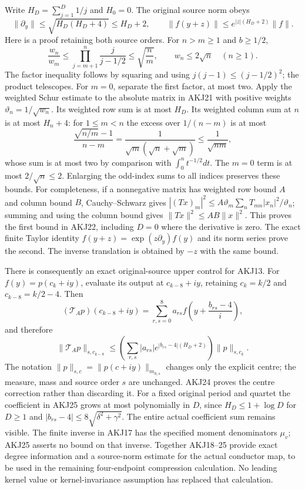 \documentclass[11pt,a4paper]{article}
\begin{document}
Write $H_D=\sum_{j=1}^D1/j$ and $H_0=0$. The original source norm obeys
\[
 \|\partial_y\|\le\sqrt{H_D(H_D+4)}\le H_D+2,
 \qquad
 \|f(y+z)\|\le e^{|z|(H_D+2)}\|f\|.
 \tag{AKJ22}
\]
Here is a proof retaining both source orders. For $n>m\ge1$ and
$b\ge1/2$,
\[
 \frac{w_n}{w_m}\le\prod_{j=m+1}^n\frac{j}{j-1/2}
 \le\sqrt{\frac nm},\qquad w_n\le2\sqrt n\quad(n\ge1).
 \tag{AKJ23}
\]
The factor inequality follows by squaring and using
$j(j-1)\le(j-1/2)^2$; the product telescopes. For $m=0$, separate
the first factor, at most two. Apply the weighted Schur estimate to
the absolute matrix in AKJ21 with positive weights $\vartheta_n=1/\sqrt{w_n}$.
Its weighted row sum is at most $H_D$. Its weighted column sum at $n$
is at most $H_n+4$: for $1\le m<n$ the excess over $1/(n-m)$ is at most
\[
 \frac{\sqrt{n/m}-1}{n-m}
 =\frac1{\sqrt m(\sqrt n+\sqrt m)}\le\frac1{\sqrt{nm}},
\]
whose sum is at most two by comparison with $\int_0^n t^{-1/2}dt$.
The $m=0$ term is at most $2/\sqrt n\le2$. Enlarging the odd-index
sums to all indices preserves these bounds. For completeness, if a
nonnegative matrix has weighted row bound $A$ and column bound $B$,
Cauchy--Schwarz gives
$|(Tx)_m|^2\le A\vartheta_m\sum_nT_{mn}|x_n|^2/\vartheta_n$;
summing and using the column bound gives $\|Tx\|^2\le AB\|x\|^2$.
This proves the first bound in AKJ22, including $D=0$ where the
derivative is zero. The exact finite Taylor identity
$f(y+z)=\exp(z\partial_y)f(y)$ and its norm series prove the second.
The inverse translation is obtained by $-z$ with the same bound.

There is consequently an exact original-source upper control for AKJ13.
For $f(y)=p(c_k+iy)$, evaluate its output at $c_{k-8}+iy$, retaining
$c_k=k/2$ and $c_{k-8}=k/2-4$. Then
\[
 (\mathcal T_Ap)(c_{k-8}+iy)
 =\sum_{r,s=0}^8a_{rs}
   f\left(y+\frac{b_{rs}-4}{i}\right),
 \tag{AKJ24}
\]
and therefore
\[
 \|\mathcal T_Ap\|_{s,c_{k-8}}
 \le\left(\sum_{r,s}|a_{rs}|
          e^{|b_{rs}-4|(H_D+2)}\right)\|p\|_{s,c_k}.
 \tag{AKJ25}
\]
The notation $\|p\|_{s,c}=\|p(c+iy)\|_{m_{0,s}}$ changes only the
explicit centre; the measure, mass and source order $s$ are unchanged.
AKJ24 proves the centre correction rather than discarding it. For a
fixed original period and quartet the coefficient in AKJ25 grows at
most polynomially in $D$, since $H_D\le1+\log D$ for $D\ge1$ and
$|b_{rs}-4|\le8\sqrt{\delta^2+\gamma^2}$. The entire actual coefficient
sum remains visible. The finite inverse in AKJ17 has the specified
moment denominators $\mu_v$; AKJ25 asserts no bound on that inverse.
Together AKJ18--25 provide exact degree information and a source-norm
estimate for the actual conductor map, to be used in the remaining
four-endpoint compression calculation. No leading kernel value or
kernel-invariance assumption has replaced that calculation.
\end{document}
